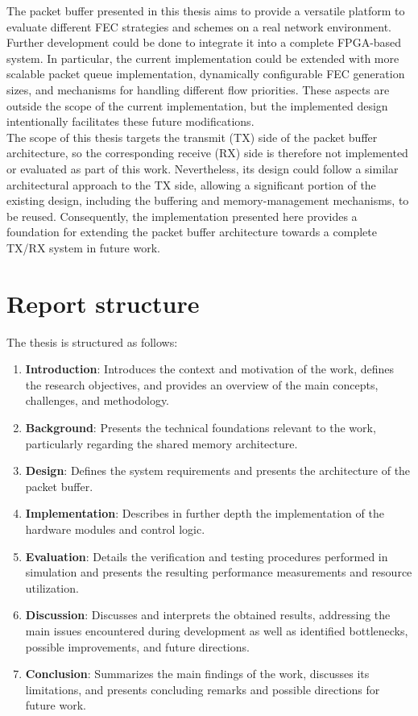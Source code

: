 The packet buffer presented in this thesis aims to provide a versatile platform to evaluate different FEC strategies and schemes on a 
real network environment. \\

Further development could be done to integrate it into a complete FPGA-based system. In particular, the 
current implementation could be extended with more scalable packet queue implementation, dynamically configurable FEC generation sizes, and 
mechanisms for handling different flow priorities. These aspects are outside the scope of the current implementation, but the implemented 
design intentionally facilitates these future modifications. \\

The scope of this thesis targets the transmit (TX) side of the packet buffer architecture, so the corresponding receive (RX) 
side is therefore not implemented or evaluated as part of this work. Nevertheless, its design could follow a similar architectural approach 
to the TX side, allowing a significant portion of the existing design, including the buffering and memory-management mechanisms, to be reused. 
Consequently, the implementation presented here provides a foundation for extending the packet buffer architecture towards a complete TX/RX 
system in future work.

\section{Report structure}

The thesis is structured as follows:

\begin{enumerate}
  \item \textbf{Introduction}: Introduces the context and motivation of the work, defines the research objectives, and provides an overview of the main concepts, challenges, and methodology.
  \item \textbf{Background}: Presents the technical foundations relevant to the work, particularly regarding the shared memory architecture.
  \item \textbf{Design}: Defines the system requirements and presents the architecture of the packet buffer.
  \item \textbf{Implementation}: Describes in further depth the implementation of the hardware modules and control logic.
  \item \textbf{Evaluation}: Details the verification and testing procedures performed in simulation and presents the resulting performance measurements and resource utilization.
  \item \textbf{Discussion}: Discusses and interprets the obtained results, addressing the main issues encountered during development as well as identified bottlenecks, possible improvements, and future directions.
  \item \textbf{Conclusion}: Summarizes the main findings of the work, discusses its limitations, and presents concluding remarks and possible directions for future work.
\end{enumerate}
